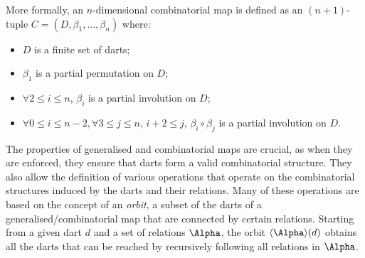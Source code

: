 More formally, an $n$-dimensional combinatorial map is defined as an $(n+1)$-tuple $C = (D, \beta_{1}, \ldots, \beta_{n})$ where:

\begin{itemize}
\item
$D$ is a finite set of darts;

\item
$\beta_{1}$ is a partial permutation on $D$;

\item
$\forall 2 \leq i \leq n$, $\beta_{i}$ is a partial involution on $D$;

\item
$\forall 0 \leq i \leq n-2, \forall 3 \leq j \leq n$, $i+2 \leq j$, $\beta_{i}\circ \beta_{j}$ is a partial involution on $D$.
\end{itemize}

The properties of generalised and combinatorial maps are crucial, as when they are enforced, they ensure that darts form a valid combinatorial structure.
They also allow the definition of various operations that operate on the combinatorial structures induced by the darts and their relations.
Many of these operations are based on the concept of an \emph{orbit}, a subset of the darts of a generalised/combinatorial map that are connected by certain relations.
Starting from a given dart $d$ and a set of relations $\Alpha$, the orbit $\langle\Alpha\rangle(d)$ obtains all the darts that can be reached by recursively following all relations in $\Alpha$.

